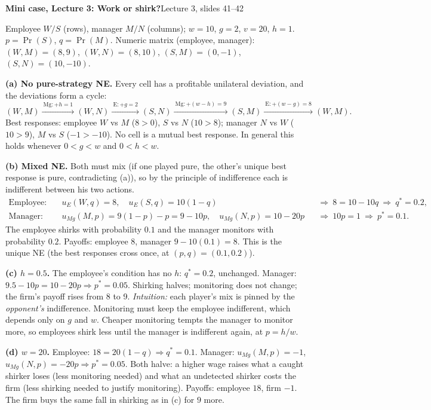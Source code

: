 \documentclass[10pt,a4paper]{article}
\begin{document}
{\large\textbf{Mini case, Lecture 3: Work or shirk?}}\hfill Lecture 3, slides 41--42

Employee $W/S$ (rows), manager $M/N$ (columns); $w = 10$, $g = 2$, $v = 20$, $h = 1$.
$p = \Pr(S)$, $q = \Pr(M)$. Numeric matrix (employee, manager):
$(W,M) = (8, 9)$, $(W,N) = (8, 10)$, $(S,M) = (0, -1)$, $(S,N) = (10, -10)$.

\textbf{(a) No pure-strategy NE.} Every cell has a profitable unilateral deviation, and the
deviations form a cycle:
\[
(W,M) \xrightarrow{\ \text{Mg}: +h = 1\ } (W,N) \xrightarrow{\ \text{E}: +g = 2\ } (S,N)
\xrightarrow{\ \text{Mg}: +(w-h) = 9\ } (S,M) \xrightarrow{\ \text{E}: +(w-g) = 8\ } (W,M).
\]
Best responses: employee $W$ vs $M$ ($8 > 0$), $S$ vs $N$ ($10 > 8$); manager $N$ vs $W$
($10 > 9$), $M$ vs $S$ ($-1 > -10$). No cell is a mutual best response. In general this holds
whenever $0 < g < w$ and $0 < h < w$.

\textbf{(b) Mixed NE.} Both must mix (if one played pure, the other's unique best response is pure,
contradicting (a)), so by the principle of indifference each is indifferent between his two actions.
\begin{align*}
\text{Employee:}\quad & u_E(W, q) = 8, \quad u_E(S, q) = 10(1 - q)
  &&\Rightarrow\ 8 = 10 - 10q \ \Rightarrow\ q^* = 0.2,\\
\text{Manager:}\quad & u_{Mg}(M, p) = 9(1 - p) - p = 9 - 10p, \quad u_{Mg}(N, p) = 10 - 20p
  &&\Rightarrow\ 10p = 1 \ \Rightarrow\ p^* = 0.1.
\end{align*}
The employee shirks with probability $0.1$ and the manager monitors with probability $0.2$.
Payoffs: employee $8$, manager $9 - 10(0.1) = 8$. This is the unique NE (the best responses cross
once, at $(p, q) = (0.1, 0.2)$).

\textbf{(c) $h = 0.5$.} The employee's condition has no $h$: $q^* = 0.2$, unchanged. Manager:
$9.5 - 10p = 10 - 20p \Rightarrow p^* = 0.05$. Shirking halves; monitoring does not change; the
firm's payoff rises from 8 to 9. \emph{Intuition:} each player's mix is pinned by the
\emph{opponent's} indifference. Monitoring must keep the employee indifferent, which depends only on
$g$ and $w$. Cheaper monitoring tempts the manager to monitor more, so employees shirk less until the
manager is indifferent again, at $p = h/w$.

\textbf{(d) $w = 20$.} Employee: $18 = 20(1 - q) \Rightarrow q^* = 0.1$. Manager:
$u_{Mg}(M, p) = -1$, $u_{Mg}(N, p) = -20p \Rightarrow p^* = 0.05$. Both halve: a higher wage raises
what a caught shirker loses (less monitoring needed) and what an undetected shirker costs the firm
(less shirking needed to justify monitoring). Payoffs: employee $18$, firm $-1$. The firm buys the
same fall in shirking as in (c) for $9$ more.
\end{document}
